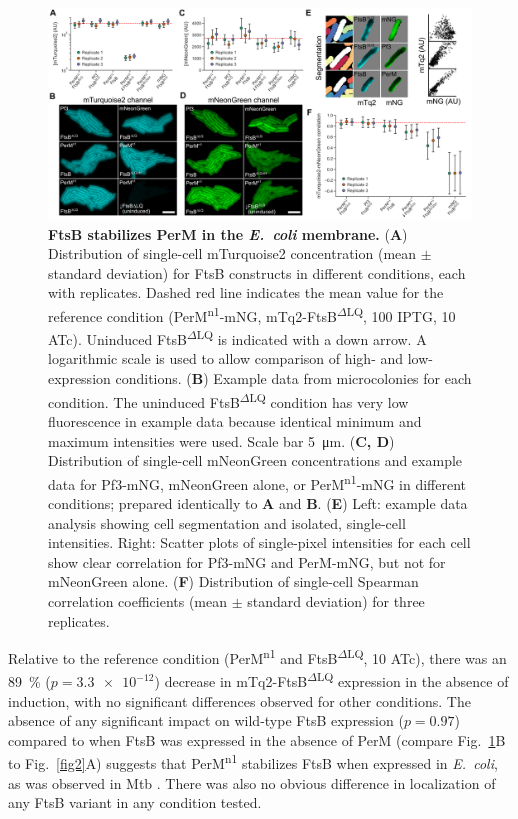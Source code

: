 \documentclass[pdflatex,sn-basic]{sn-jnl}%
\newcommand\ec{\textit{E.~coli}}
\newcommand\mtb{Mtb}
\newcommand\ftsbdLQ{FtsB\textsuperscript{$\Delta{}$LQ}}
\newcommand\permN{PerM\textsuperscript{n1}}
\begin{document}
\begin{figure}[h]
\centering
\includegraphics[width=1.0\textwidth]{../figures/fig3.png}
\caption{
    \textbf{FtsB stabilizes PerM in the \ec{} membrane.}
    (\textbf{A}) Distribution of single-cell mTurquoise2 concentration (mean $\pm$ standard deviation) for FtsB constructs in different conditions, each with replicates. Dashed red line indicates the mean value for the reference condition (\permN{}-mNG, mTq2-\ftsbdLQ{}, \qty{100}{\uM} IPTG, \qty{10}{\nM} ATc). Uninduced \ftsbdLQ{} is indicated with a down arrow. A logarithmic scale is used to allow comparison of high- and low-expression conditions.
    (\textbf{B}) Example data from microcolonies for each condition. The uninduced \ftsbdLQ{} condition has very low fluorescence in example data because identical minimum and maximum intensities were used. Scale bar \qty{5}{\um}.
    (\textbf{C, D}) Distribution of single-cell mNeonGreen concentrations and example data for Pf3-mNG, mNeonGreen alone, or \permN{}-mNG in different conditions; prepared identically to \textbf{A} and \textbf{B}.
    (\textbf{E}) Left: example data analysis showing cell segmentation and isolated, single-cell intensities. Right: Scatter plots of single-pixel intensities for each cell show clear correlation for Pf3-mNG and PerM-mNG, but not for mNeonGreen alone. (\textbf{F}) Distribution of single-cell Spearman correlation coefficients (mean $\pm$ standard deviation) for three replicates.
}\label{fig3}
\end{figure}

Relative to the reference condition (\permN{} and \ftsbdLQ{}, \qty{10}{\nM} ATc), there was an \qty{89}{\percent} ($p=\num{3.3e-12}$) decrease in mTq2-\ftsbdLQ{} expression in the absence of induction, with no significant differences observed for other conditions. The absence of any significant impact on wild-type FtsB expression ($p=0.97$) compared to when FtsB was expressed in the absence of PerM (compare Fig.~\ref{fig3}B to Fig.~\ref{fig2}A) suggests that \permN{} stabilizes FtsB when expressed in \ec{}, as was observed in \mtb{} \citep{wangPersistentMycobacteriumTuberculosis2019}. There was also no obvious difference in localization of any FtsB variant in any condition tested.
\end{document}
